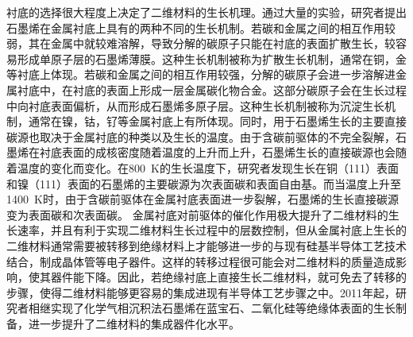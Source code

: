     衬底的选择很大程度上决定了二维材料的生长机理。通过大量的实验，研究者提出石墨烯在金属衬底上具有的两种不同的生长机制。若碳和金属之间的相互作用较弱，其在金属中就较难溶解，导致分解的碳原子只能在衬底的表面扩散生长，较容易形成单原子层的石墨烯薄膜。这种生长机制被称为扩散生长机制，通常在铜，金等衬底上体现。若碳和金属之间的相互作用较强，分解的碳原子会进一步溶解进金属衬底中，在衬底的表面上形成一层金属碳化物合金。这部分碳原子会在生长过程中向衬底表面偏析，从而形成石墨烯多原子层。这种生长机制被称为沉淀生长机制，通常在镍，钴，钌等金属衬底上有所体现。同时，用于石墨烯生长的主要直接碳源也取决于金属衬底的种类以及生长的温度。由于含碳前驱体的不完全裂解，石墨烯在衬底表面的成核密度随着温度的上升而上升，石墨烯生长的直接碳源也会随着温度的变化而变化。在\SI{800}{\kelvin}的生长温度下，研究者发现生长在铜（111）表面和镍（111）表面的石墨烯的主要碳源为次表面碳和表面自由基。而当温度上升至\SI{1400}{\kelvin}时，由于含碳前驱体在金属衬底表面进一步裂解，石墨烯的生长直接碳源变为表面碳和次表面碳。
    金属衬底对前驱体的催化作用极大提升了二维材料的生长速率，并且有利于实现二维材料生长过程中的层数控制，但从金属衬底上生长的二维材料通常需要被转移到绝缘材料上才能够进一步的与现有硅基半导体工艺技术结合，制成晶体管等电子器件。这样的转移过程很可能会对二维材料的质量造成影响，使其器件能下降。因此，若绝缘衬底上直接生长二维材料，就可免去了转移的步骤，使得二维材料能够更容易的集成进现有半导体工艺步骤之中。2011年起，研究者相继实现了化学气相沉积法石墨烯在蓝宝石、二氧化硅等绝缘体表面的生长制备，进一步提升了二维材料的集成器件化水平。

